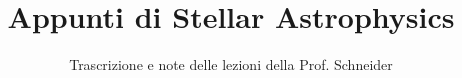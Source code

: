 \documentclass[a4paper,12pt]{article}
\title{Appunti di Stellar Astrophysics}
\author{Trascrizione e note delle lezioni della Prof. Schneider}
\date{}
\begin{document}
\maketitle
\projectintro
\tableofcontents
\newpage

\end{document}
